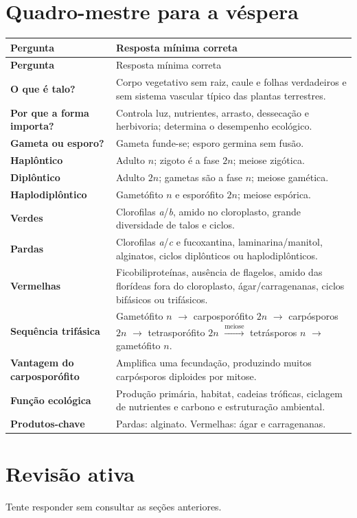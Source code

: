 \documentclass[12pt,a4paper]{article}
\newcommand{\n}{\ensuremath{n}}
\newcommand{\dn}{\ensuremath{2n}}
\begin{document}
\section{Quadro-mestre para a véspera}
\begin{longtable}{>{\bfseries}p{}p{}}
\toprule
Pergunta & Resposta mínima correta\\
\midrule
\endfirsthead
\toprule
Pergunta & Resposta mínima correta\\
\midrule
\endhead
O que é talo? & Corpo vegetativo sem raiz, caule e folhas verdadeiros e sem
sistema vascular típico das plantas terrestres.\\
Por que a forma importa? & Controla luz, nutrientes, arrasto, dessecação e
herbivoria; determina o desempenho ecológico.\\
Gameta ou esporo? & Gameta funde-se; esporo germina sem fusão.\\
Haplôntico & Adulto \n; zigoto é a fase \dn; meiose zigótica.\\
Diplôntico & Adulto \dn; gametas são a fase \n; meiose gamética.\\
Haplodiplôntico & Gametófito \n{} e esporófito \dn; meiose espórica.\\
Verdes & Clorofilas \textit{a}/\textit{b}, amido no cloroplasto, grande
diversidade de talos e ciclos.\\
Pardas & Clorofilas \textit{a}/\textit{c} e fucoxantina, laminarina/manitol,
alginatos, ciclos diplônticos ou haplodiplônticos.\\
Vermelhas & Ficobiliproteínas, ausência de flagelos, amido das florídeas fora do
cloroplasto, ágar/carragenanas, ciclos bifásicos ou trifásicos.\\
Sequência trifásica & Gametófito \n{} $\rightarrow$ carposporófito \dn{}
$\rightarrow$ carpósporos \dn{} $\rightarrow$ tetrasporófito \dn{}
$\xrightarrow{\text{meiose}}$ tetrásporos \n{} $\rightarrow$ gametófito \n.\\
Vantagem do carposporófito & Amplifica uma fecundação, produzindo muitos
carpósporos diploides por mitose.\\
Função ecológica & Produção primária, habitat, cadeias tróficas, ciclagem de
nutrientes e carbono e estruturação ambiental.\\
Produtos-chave & Pardas: alginato. Vermelhas: ágar e carragenanas.\\
\bottomrule
\end{longtable}

\section{Revisão ativa}
Tente responder sem consultar as seções anteriores.
\end{document}
